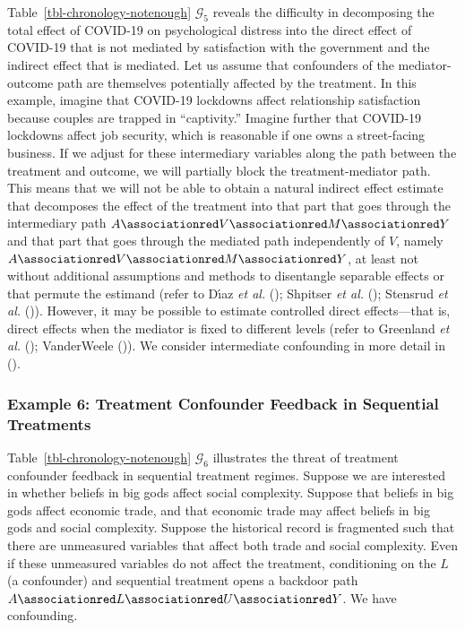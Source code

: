 \documentclass[
  single column]{article}
\begin{document}
Table~\ref{tbl-chronology-notenough} \(\mathcal{G}_5\) reveals the
difficulty in decomposing the total effect of COVID-19 on psychological
distress into the direct effect of COVID-19 that is not mediated by
satisfaction with the government and the indirect effect that is
mediated. Let us assume that confounders of the mediator-outcome path
are themselves potentially affected by the treatment. In this example,
imagine that COVID-19 lockdowns affect relationship satisfaction because
couples are trapped in ``captivity.'' Imagine further that COVID-19
lockdowns affect job security, which is reasonable if one owns a
street-facing business. If we adjust for these intermediary variables
along the path between the treatment and outcome, we will partially
block the treatment-mediator path. This means that we will not be able
to obtain a natural indirect effect estimate that decomposes the effect
of the treatment into that part that goes through the intermediary path
\(A \associationred V \associationred M \associationred Y\) and that
part that goes through the mediated path independently of \(V\), namely
\(A \associationred V \associationred M \associationred Y\), at least
not without additional assumptions and methods to disentangle separable
effects or that permute the estimand (refer to Dı́az \emph{et al.}
(); Shpitser \emph{et al.}
(); Stensrud \emph{et al.}
()). However, it may be
possible to estimate controlled direct effects---that is, direct effects
when the mediator is fixed to different levels (refer to Greenland
\emph{et al.} (); VanderWeele
()). We consider intermediate
confounding in more detail in ().

\subsubsection{Example 6: Treatment Confounder Feedback in Sequential
Treatments}\label{example-6-treatment-confounder-feedback-in-sequential-treatments}

Table~\ref{tbl-chronology-notenough} \(\mathcal{G}_6\) illustrates the
threat of treatment confounder feedback in sequential treatment regimes.
Suppose we are interested in whether beliefs in big gods affect social
complexity. Suppose that beliefs in big gods affect economic trade, and
that economic trade may affect beliefs in big gods and social
complexity. Suppose the historical record is fragmented such that there
are unmeasured variables that affect both trade and social complexity.
Even if these unmeasured variables do not affect the treatment,
conditioning on the \(L\) (a confounder) and sequential treatment opens
a backdoor path
\(A \associationred L \associationred U \associationred Y\). We have
confounding.
\end{document}

